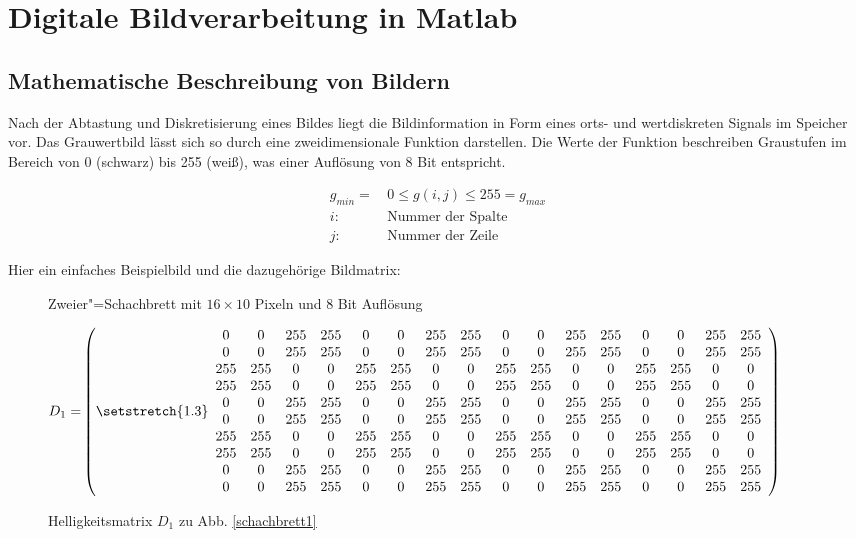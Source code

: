 \section{Digitale Bildverarbeitung in Matlab}
\subsection{Mathematische Beschreibung von Bildern}
Nach der Abtastung und Diskretisierung eines Bildes liegt die Bildinformation in Form eines
orts- und wertdiskreten Signals im Speicher vor. Das Grauwertbild lässt sich so durch eine
zweidimensionale Funktion darstellen. Die Werte der Funktion beschreiben Graustufen im
Bereich von 0 (schwarz) bis 255 (weiß), was einer Auflösung von 8 Bit entspricht.

\begin{align}
g_{min}=&\, 0  \leq g(i,j) \leq 255 = g_{max}\\
i:&\, \text{Nummer der Spalte}\nonumber\\
j:&\, \text{Nummer der Zeile}\nonumber
\end{align}

\noindent Hier ein einfaches Beispielbild und die dazugehörige Bildmatrix:

\begin{figure}[htbp]
	\centering
	\caption{Zweier"=Schachbrett mit $16 \times 10$ Pixeln und $8$ Bit Auflösung}\label{schachbrett1}
	\label{fig:schachbrett}
\end{figure}

\begin{figure}[htbp]
	\centering
	{\small 
		${ D_1=}
		\left(
\setstretch{1.3}\begin{array}{cccccccccccccccc}
		0&0&255&255&0&0&255&255&0&0&255&255&0&0&255&255\\ 
		0&0&255&255&0&0&255&255&0&0&255&255&0&0&255&255\\
		255&255&0&0&255&255&0&0&255&255&0&0&255&255&0&0\\
		255&255&0&0&255&255&0&0&255&255&0&0&255&255&0&0\\
		0&0&255&255&0&0&255&255&0&0&255&255&0&0&255&255\\
		0&0&255&255&0&0&255&255&0&0&255&255&0&0&255&255\\
		255&255&0&0&255&255&0&0&255&255&0&0&255&255&0&0\\
		255&255&0&0&255&255&0&0&255&255&0&0&255&255&0&0\\
		0&0&255&255&0&0&255&255&0&0&255&255&0&0&255&255\\
		0&0&255&255&0&0&255&255&0&0&255&255&0&0&255&255\\
		\end{array}
		\right)$} \caption{Helligkeitsmatrix $D_1$ zu Abb.
		\ref{schachbrett1}}
	\label{fig:matrix}
\end{figure}

